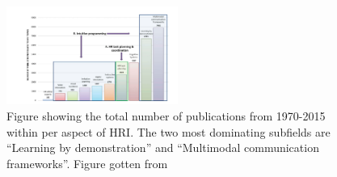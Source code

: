 \documentclass[conference]{IEEEtran}
\begin{document}
\begin{figure}[h]
    \centerline{\includegraphics[width=0.5\textwidth]{images/hri_total_number_of_publication.png}}
    \caption{Figure showing the total number of publications from 1970-2015 within per aspect of HRI. The two most dominating subfields are ``Learning by demonstration'' and ``Multimodal communication frameworks''. Figure gotten from \autocite{tsarouchi2016human}}
\label{fig2}
\end{figure}
\end{document}
